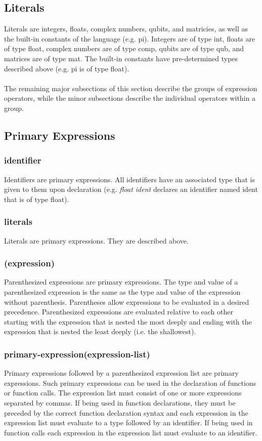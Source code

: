 
\subsection{Literals}
Literals are integers, floats, complex numbers, qubits, and matricies, as well as the built-in constants of the language (e.g. pi). Integers are of type int, floats are of type float, complex numbers are of type comp, qubits are of type qub, and matrices are of type mat. The built-in constants have pre-determined types described above (e.g. pi is of type float).\\\\
The remaining major subsections of this section describe the groups of expression operators, while the minor subsections describe the individual operators within a group.
\subsection{Primary Expressions}
\subsubsection{identifier}
Identifiers are primary expressions. All identifiers have an associated type that is given to them upon declaration (e.g. \textit{float ident} declares an identifier named ident that is of type float).
\subsubsection{literals}
Literals are primary expressions. They are described above.
\subsubsection{(expression)}
Parenthesized expressions are primary expressions. The type and value of a parenthesized expression is the same as the type and value of the expression without parenthesis. Parentheses allow expressions to be evaluated in a desired precedence. Parenthesized expressions are evaluated relative to each other starting with the expression that is nested the most deeply and ending with the expression that is nested the least deeply (i.e. the shallowest).
\subsubsection{primary-expression(expression-list)}
Primary expressions followed by a parenthesized expression list are primary expressions. Such primary expressions can be used in the declaration of functions or function calls. The expression list must consist of one or more expressions separated by commas. If being used in function declarations, they must be preceded by the correct function declaration syntax and each expression in the expression list must evaluate to a type followed by an identifier. If being used in function calls each expression in the expression list must evaluate to an identifier.
